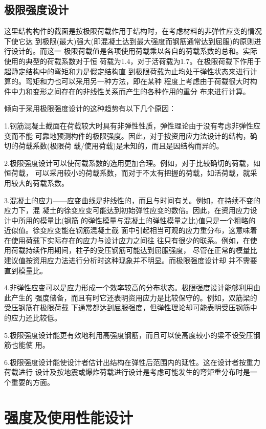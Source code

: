 \documentclass[12pt,a4paper]{book}
\begin{document}
\subsection{极限强度设计}

这里结构构件的截面是按极限荷载作用于结构时，在考虑材料的非弹性应变的情况下使它达
到极限(最大)强大(即混凝土达到最大强度而钢筋通常达到屈服)的原则进行设计的。而这一
极限荷载值是各项使用荷载乘以各自的荷载系数的总和。实际使用的典型的荷载系数对于恒
荷载为1.4，对于活荷载为1.7。在极限荷载下作用于超静定结构中的弯矩和力是假定结构直
到极限荷载为止均处于弹性状态来进行计算的。弯矩和力也可以采用另一种方法，即在某种
程度上考虑由于荷载很大时构件中力和变形之间存在的非线性关系而产生的各种作用的重分
布来进行计算。

倾向于采用极限强度设计的这种趋势有以下几个原因：

1.钢筋混凝土截面在荷载较大时具有非弹性性质，弹性理论由于没有考虑非弹性应变而不能
可靠地预测构件的极限强度。因此，对于按资用应力法设计的结构，确切的荷载系数(极限荷
载/使用荷载)是未知的，而且是因结构而异的。

2.极限强度设计可以使荷载系数的选用更加合理。例如，对于比较确切的荷载，如恒荷载，
可以采用较小的荷载系数，而对于不太有把握的荷载，如活荷载，就采用较大的荷载系数。

3.混凝土的应力——应变曲线是非线性的，而且与时间有关。例如，在持续不变的应力下，混
凝土的徐变应变可能达到初始弹性应变的数倍。因此，在资用应力设计中所用的模量比(钢筋
的弹性模量与混凝土的弹性模量之比)值只是一个粗略的近似值。徐变应变能在钢筋混凝土截
面中引起相当可观的应力重分布，这意味着在使用荷载下实际存在的应力与设计应力之间往
往只有很少的联系。例如，在使用荷载持续作用期间，柱子的受压钢筋可能达到屈服强度，
尽管在正常的模量比建议值按资用应力法进行分析时这种现象并不明显。而极限强度设计却
并不需要直到模量比。

4.非弹性应变可以是应力形成一个效率较高的分布状态。极限强度设计能够利用由此产生的
强度储备，而且有时它还表明资用应力是比较保守的。例如，双筋梁的受压钢筋在极限荷载
下通常都达到屈服强度，但弹性理论却可能表明受压钢筋中的应力还比较低。

5.极限强度设计能更有效地利用高强度钢筋，而且可以使高度较小的梁不设受压钢筋也能使
用。

6.极限强度设计能使设计者估计出结构在弹性后范围内的延性。这在设计者按重力荷载进行
设计及按地震或爆炸荷载进行设计是考虑可能发生的弯矩重分布时是一个重要的方面。

\section{强度及使用性能设计}
\end{document}
